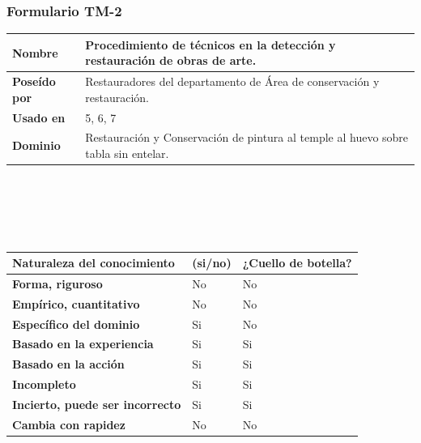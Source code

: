 \documentclass[a4paper,11pt]{article}
\begin{document}
			\subsubsection{Formulario TM-2}
			\begin{center}
				\begin{tabular}{| p{3cm} | p{8.85cm} |}
					\hline
					\cellcolor[RGB]{224,233,250}\textbf{Nombre} & Procedimiento de técnicos en
					la detección y restauración de obras de arte.\\
					\hline
					\cellcolor[RGB]{224,233,250}\textbf{Poseído por} & Restauradores del
					departamento de Área de conservación y restauración.\\
					\hline
					\cellcolor[RGB]{224,233,250}\textbf{Usado en} & 5, 6, 7\\
					\hline
					\cellcolor[RGB]{224,233,250}\textbf{Dominio} & Restauración y Conservación
					de pintura al temple al huevo sobre tabla sin entelar.\\
					\hline
				\end{tabular}
				\\
				\textbf{}
				\\
				\\
				\textbf{}
				\\
				\begin{tabular}{| p{6.3cm} | l | p{3.8cm} |}
					\hline
					\cellcolor[RGB]{224,233,250}\textbf{Naturaleza del conocimiento} &
					\cellcolor[RGB]{224,233,250}\textbf{(si/no)} &
					\cellcolor[RGB]{224,233,250}\textbf{¿Cuello de botella?}\\
					\hline
					\cellcolor[RGB]{224,233,250}\textbf{Forma, riguroso} & No & No\\
					\hline
					\cellcolor[RGB]{224,233,250}\textbf{Empírico, cuantitativo} & No & No\\
					\hline
					\cellcolor[RGB]{224,233,250}\textbf{Específico del dominio} & Si & No\\
					\hline
					\cellcolor[RGB]{224,233,250}\textbf{Basado en la experiencia} & Si & Si \\
					\hline
					\cellcolor[RGB]{224,233,250}\textbf{Basado en la acción} & Si & Si \\
					\hline
					\cellcolor[RGB]{224,233,250}\textbf{Incompleto} & Si & Si \\
					\hline
					\cellcolor[RGB]{224,233,250}\textbf{Incierto, puede ser incorrecto} & Si &
					Si \\
					\hline
					\cellcolor[RGB]{224,233,250}\textbf{Cambia con rapidez} & No & No\\

\end{tabular}
\end{center}
\end{document}
